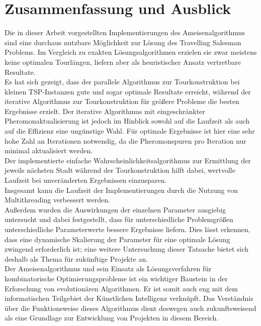 \documentclass[doktyp=barbeit, sprache=german]{TUBAFarbeiten}
\begin{document}
\section{Zusammenfassung und Ausblick}
Die in dieser Arbeit vorgestellten Implementierungen des Ameisenalgorithmus sind eine durchaus nutzbare Möglichkeit zur Lösung des Travelling Salesman Problems. Im Vergleich zu exakten Lösungsalgorithmen erzielen sie zwar meistens keine optimalen Tourlängen, liefern aber als heuristischer Ansatz vertretbare Resultate.
\\Es hat sich gezeigt, dass der parallele Algorithmus zur Tourkonstruktion bei kleinen TSP-Instanzen gute und sogar optimale Resultate erreicht, während der iterative Algorithmus zur Tourkonstruktion für größere Probleme die besten Ergebnisse erzielt. Der iterative Algorithmus mit eingeschränkter Pheromonaktualisierung ist jedoch im Hinblick sowohl auf die Laufzeit als auch auf die Effizienz eine ungünstige Wahl. Für optimale Ergebnisse ist hier eine sehr hohe Zahl an Iterationen notwendig, da die Pheromonspuren pro Iteration nur minimal aktualisiert werden.
\\Der implementierte einfache Wahrscheinlichkeitsalgorithmus zur Ermittlung der jeweils nächsten Stadt während der Tourkonstruktion hilft dabei, wertvolle Laufzeit bei unveränderten Ergebnissen einzusparen. 
\\Insgesamt kann die Laufzeit der Implementierungen durch die Nutzung von Multithreading verbessert werden.
\\Außerdem wurden die Auswirkungen der einzelnen Parameter ausgiebig untersucht und dabei festgestellt, dass für unterschiedliche Problemgrößen unterschiedliche Parameterwerte bessere Ergebnisse liefern.
Dies lässt erkennen, dass eine dynamische Skalierung der Parameter für eine optimale Lösung zwingend erforderlich ist; eine weitere Untersuchung dieser Tatsache bietet sich deshalb als Thema für zukünftige Projekte an.
\\Der Ameisenalgorithmus und sein Einsatz als Lösungsverfahren für kombinatorische Optimierungsprobleme ist ein wichtiger Baustein in der Erforschung von evolutionären Algorithmen. Er ist somit auch eng mit dem informatischen Teilgebiet der Künstlichen Intelligenz verknüpft. Das Verständnis über die Funktionsweise dieses Algorithmus dient deswegen auch zukunftsweisend als eine Grundlage zur Entwicklung von Projekten in diesem Bereich.
\newpage
\appendix
\end{document}
